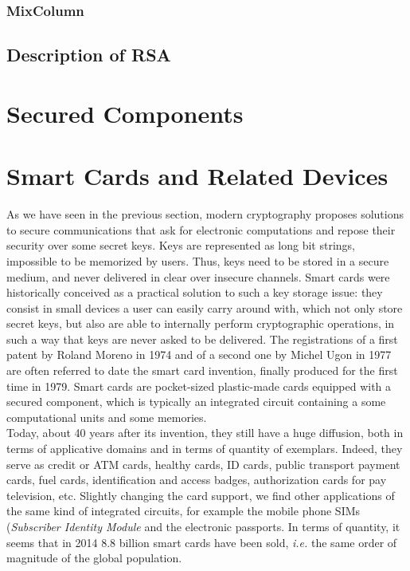 \subsubsection*{MixColumn}


\subsection{Description of RSA}


\section{Secured Components}
\section{Smart Cards and Related Devices}
As we have seen in the previous section, modern cryptography proposes solutions to secure communications that ask for electronic computations and repose their security over some secret keys. Keys are represented as long bit strings, impossible to be memorized by users. Thus, keys need to be stored in a secure medium, and never delivered in clear over insecure channels. Smart cards were historically conceived as a practical solution to such a key storage issue: they consist in small devices a user can easily carry around with, which not only store secret keys, but also are able to internally perform cryptographic operations, in such a way that keys are never asked to be delivered. The registrations of a first patent by Roland Moreno in 1974 and of a second one by Michel Ugon in 1977 are often referred to date the smart card invention, finally produced for the first time in 1979. Smart cards are pocket-sized plastic-made cards equipped with a secured component, which is typically an integrated circuit containing a some computational units and some memories.\\

Today, about 40 years after its invention, they still have a huge diffusion, both in terms of applicative domains and in terms of quantity of exemplars. Indeed, they serve as credit or ATM cards, healthy cards, ID cards, public transport payment cards, fuel cards, identification and access badges, authorization cards for pay television, etc. Slightly changing the card support, we find other applications of the same kind of integrated circuits, for example the  mobile phone SIMs (\emph{Subscriber Identity Module} and the electronic passports. In terms of quantity, it seems that in 2014 8.8 billion smart cards have been sold, \emph{i.e.} the same order of magnitude of the global population. \\

